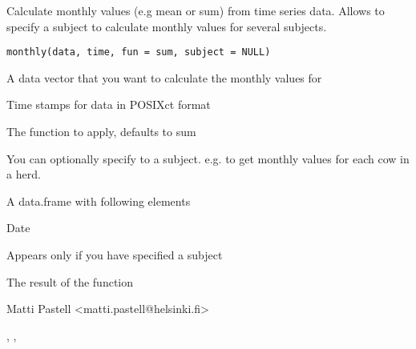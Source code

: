 \documentclass{book}
\begin{document}
\begin{Description}\relax
Calculate monthly values (e.g mean or sum) from time series data. Allows
to specify a subject to calculate monthly values for several subjects.
\end{Description}
\begin{Usage}
\begin{verbatim}
monthly(data, time, fun = sum, subject = NULL)
\end{verbatim}
\end{Usage}
\begin{Arguments}
\begin{ldescription}
\item[\code{data}] A data vector that you want to calculate the monthly values
for
\item[\code{time}] Time stamps for data in POSIXct format
\item[\code{fun}] The function to apply, defaults to sum
\item[\code{subject}] You can optionally specify to a subject. e.g. to get
monthly values for each cow in a herd.
\end{ldescription}
\end{Arguments}
\begin{Value}
A data.frame with following elements
\begin{ldescription}
\item[\code{Day}] Date
\item[\code{Subject}] Appears only if you have specified a subject
\item[\code{Result}] The result of the function
\end{ldescription}
\end{Value}
\begin{Author}\relax
Matti Pastell <matti.pastell@helsinki.fi>
\end{Author}
\begin{SeeAlso}\relax
{}, ,
\end{SeeAlso}
\begin{Examples}
\end{Examples}
\end{document}
